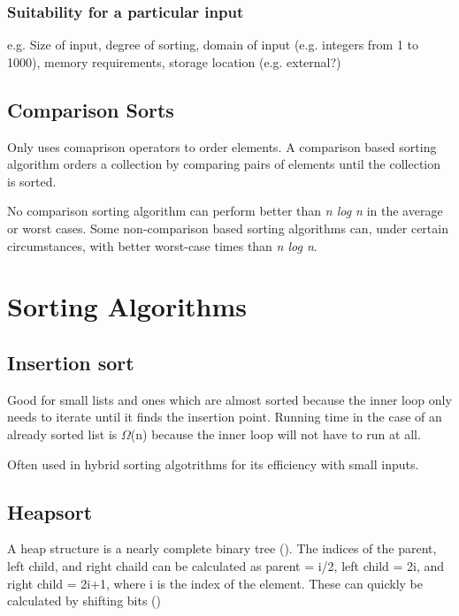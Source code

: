 \documentclass[12pt, a4paper]{article}
\begin{document}
\subsubsection{Suitability for a particular input}

e.g. Size of input, degree of sorting, domain of input (e.g. integers from 1 to 1000), memory requirements, storage location (e.g. external?)

\subsection{Comparison Sorts}

Only uses comaprison operators to order elements. A comparison based sorting algorithm orders a collection by comparing pairs of elements until the collection is sorted.

No comparison sorting algorithm can perform better than \emph{n log n} in the average or worst cases. Some non-comparison based sorting algorithms can, under certain circumstances, with better worst-case times than \emph{n log n}.

\section{Sorting Algorithms}

\subsection{Insertion sort}

Good for small lists and ones which are almost sorted because the inner loop only needs to iterate until it finds the insertion point. Running time in the case of an already sorted list is $\Omega$(n) because the inner loop will not have to run at all.

Often used in hybrid sorting algotrithms for its efficiency with small inputs.

\subsection{Heapsort}

A heap structure is a nearly complete binary tree (\cite[p. 128]{cormen01introduction}). The indices of the parent, left child, and right chaild can be calculated as parent = i/2, left child = 2i, and right child = 2i+1, where i is the index of the element. These can quickly be calculated by shifting bits (\cite[p. 128]{cormen01introduction})
\end{document}
